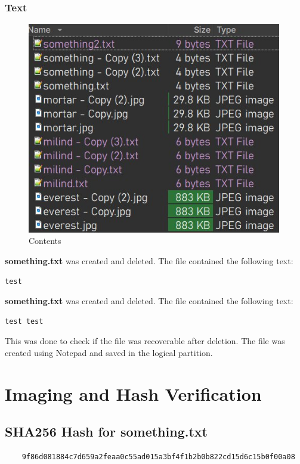 \documentclass[11pt]{article}
\begin{document}
\subsubsection{Text}

\begin{figure}[H]
    \centering
    \includegraphics[width=0.99\textwidth]{things_made.jpg}
    \caption{Contents}
    \label{fig:1}

\end{figure}
\textbf{something.txt} was created and deleted. The file contained the following text:
\begin{verbatim}
test
\end{verbatim}
\noindent
\textbf{something.txt} was created and deleted. The file contained the following text:
\begin{verbatim}
test test
\end{verbatim}
This was done to check if the file was recoverable after deletion. The file was created using Notepad and saved in the logical partition.
\section{Imaging and Hash Verification}
\subsection{SHA256 Hash for something.txt}
\begin{verbatim}
    9f86d081884c7d659a2feaa0c55ad015a3bf4f1b2b0b822cd15d6c15b0f00a08
\end{verbatim}
\end{document}
